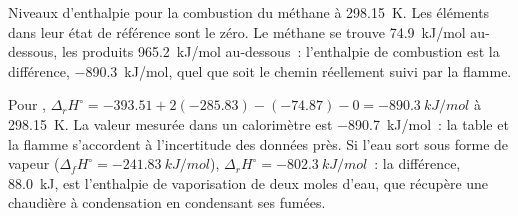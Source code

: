 \begin{omfigure}

{\small Niveaux d'enthalpie pour la combustion du méthane à \qty{298.15}{K}.
Les éléments dans leur état de référence sont le zéro. Le méthane se trouve
\qty{74.9}{kJ/mol} au-dessous, les produits \qty{965.2}{kJ/mol} au-dessous~:
l'enthalpie de combustion est la différence, \qty{-890.3}{kJ/mol}, quel que soit
le chemin réellement suivi par la flamme.}
\end{omfigure}

\begin{example}\label{ex:b2:reaction-enthalpy:methane}
Pour ,
$\Delta_r H^\circ = -393.51 + 2(-285.83) - (-74.87) - 0 =
\qty{-890.3}{kJ/mol}$ à \qty{298.15}{K}. La valeur mesurée dans un
calorimètre est \qty{-890.7}{kJ/mol}~: la table et la flamme s'accordent à
l'incertitude des données près. Si l'eau sort sous forme de vapeur
($\Delta_f H^\circ = \qty{-241.83}{kJ/mol}$), $\Delta_r H^\circ =
\qty{-802.3}{kJ/mol}$~: la différence, \qty{88.0}{kJ}, est l'enthalpie de
vaporisation de deux moles d'eau, que récupère une chaudière à condensation
en condensant ses fumées.
\end{example}

